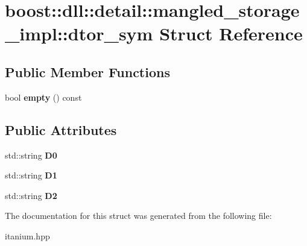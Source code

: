 \hypertarget{a00079}{}\section{boost\+:\+:dll\+:\+:detail\+:\+:mangled\+\_\+storage\+\_\+impl\+:\+:dtor\+\_\+sym Struct Reference}
\label{a00079}
\subsection*{Public Member Functions}
\begin{DoxyCompactItemize}
\item 
bool {\bfseries empty} () const \hypertarget{a00079_a0468149c80170b0cafaa7c0a810479a2}{}\label{a00079_a0468149c80170b0cafaa7c0a810479a2}

\end{DoxyCompactItemize}
\subsection*{Public Attributes}
\begin{DoxyCompactItemize}
\item 
std\+::string {\bfseries D0}\hypertarget{a00079_a17ef5095bb94db1ef8a318012710939a}{}\label{a00079_a17ef5095bb94db1ef8a318012710939a}

\item 
std\+::string {\bfseries D1}\hypertarget{a00079_af5d75b054b254565c9773f8b0b652d4b}{}\label{a00079_af5d75b054b254565c9773f8b0b652d4b}

\item 
std\+::string {\bfseries D2}\hypertarget{a00079_ae40fab2db5138e03488b204b570ac72d}{}\label{a00079_ae40fab2db5138e03488b204b570ac72d}

\end{DoxyCompactItemize}


The documentation for this struct was generated from the following file\+:\begin{DoxyCompactItemize}
\item 
itanium.\+hpp\end{DoxyCompactItemize}
